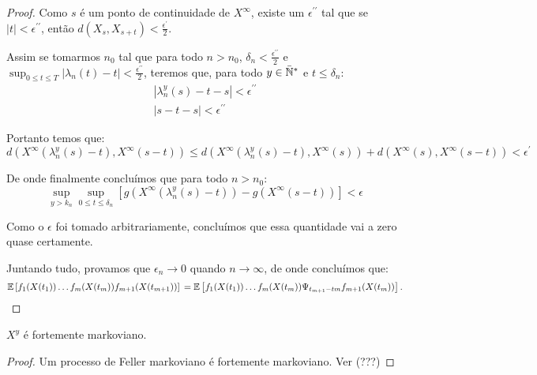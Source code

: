 \begin{proof}
  Como $s$ é \qc um ponto de continuidade de $X^\infty$, existe um
  $\epsilon^{\prime\prime}$ tal que se $|t| <
  \epsilon^{\prime\prime}$, então $d(X_{s}, X_{s+t}) < \frac{\epsilon^{\prime}}{2}$.

  Assim se tomarmos $n_0$ tal que para todo $n > n_0$, $\delta_{n} <
  \frac{\epsilon^{\prime\prime}}{2}$ e $\sup_{0 \leq t \leq T}
  |\lambda_n(t) - t| < \frac{\epsilon^{\prime\prime}}{2}$, teremos
  que, para todo $y\in{\mathbb{\bar{N}^*}}$ e $t \leq \delta_n$:
  \begin{gather*}
    |\lambda_n^y(s) - t - s| < \epsilon^{\prime\prime}\\
    |s - t - s | < \epsilon^{\prime\prime}
  \end{gather*}
  
  Portanto temos que:
  \begin{displaymath}
    d(X^\infty(\lambda_n^y(s)-t), X^\infty(s-t)) \leq
     d(X^\infty(\lambda_n^y(s)-t), X^\infty(s))+
     d(X^\infty(s), X^\infty(s-t))
     < \epsilon^{\prime}
  \end{displaymath}

  De onde finalmente concluímos que para todo $n > n_0$:
  \begin{displaymath} 
    \sup_{y > k_n}
    \sup_{0 \leq t \leq \delta_n} \left[
      g(X^\infty(\lambda_n^y(s)-t)) -
      g(X^\infty(s-t))
    \right] < \epsilon
  \end{displaymath}

  Como o $\epsilon$ foi tomado arbitrariamente, concluímos que essa
  quantidade vai a zero quase certamente.


  Juntando tudo, provamos que $\epsilon_n \to 0$ quando $n \to
  \infty$, de onde concluímos que:
  \begin{displaymath}
    {\mathbb{E}} \left[
      f_{1}(X(t_{1})) 
      \ldots
      f_{m}(X(t_{m})) 
      f_{m+1}(X(t_{m+1})) 
    \right] \notag\\
    = {\mathbb{E}} \left[
      f_{1}(X(t_{1})) 
      \ldots
      f_{m}(X(t_{m})) 
      \Psi_{t_{m+1} - t{m}} f_{m+1} (X(t_{m})) 
    \right].
  \end{displaymath}
\end{proof}




\begin{corolario}
  \label{cor:proc_fort_markov}
  $X^y$ é fortemente markoviano.
\end{corolario}
\begin{proof}
  Um processo de Feller markoviano é fortemente markoviano. Ver (???)
\end{proof}



